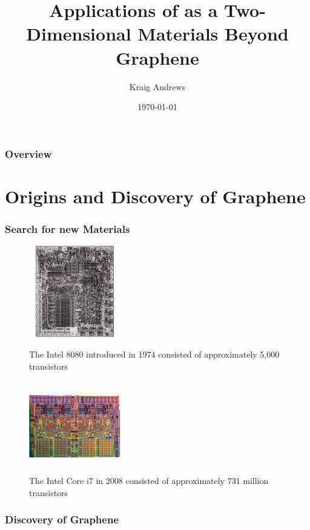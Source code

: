 \documentclass{beamer}
\title[2D Materials Beyond Graphene]{Applications of \ch{MoS2} as a Two-Dimensional Materials Beyond Graphene} %
\author{Kraig Andrews} %
\institute[Wayne State University] %
{
Wayne State University \\ %
\medskip
\textit{kraig.andrews@wayne.edu} %
}
\date{\today} %
\begin{document}
\begin{frame}
\titlepage %
\end{frame}

\begin{frame}
\frametitle{Overview} 
\tableofcontents 
\end{frame}

\section{Origins and Discovery of Graphene}
\begin{frame}
\frametitle{Search for new Materials}
\begin{figure}
\centering
\begin{minipage}{0.45\textwidth}
\centering
\includegraphics[height=4cm,width=4cm]{../present_figs/intel1974}
\caption{The Intel 8080 introduced in 1974 consisted of approximately 5,000 transistors}
\end{minipage}\hfill
\begin{minipage}{0.45\textwidth}
\centering
\includegraphics[height=4cm,width=4cm]{../present_figs/i7chip}
\caption{The Intel Core i7 in 2008 consisted of approximately 731 million transistors}
\end{minipage}
\end{figure}
\cite{Grifantini2008}
\end{frame}

\begin{frame}
\frametitle{Discovery of Graphene}
\end{frame}
\end{document}
